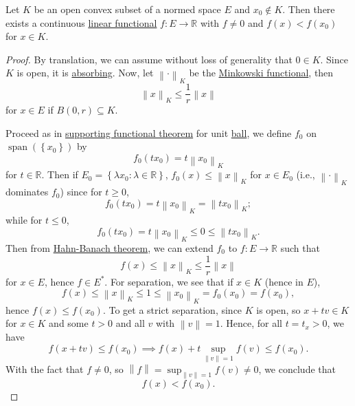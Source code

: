 \begin{theorem}\label{thm:separation-of-a-point-from-a-convex-set}
	Let \(K\) be an open convex subset of a normed space \(E\) and \(x_0 \notin K\). Then there exists a continuous \hyperref[def:linear-functional]{linear functional} \(f\colon E\to \mathbb{R} \) with \(f\neq 0\) and \(f(x) < f(x_0)\) for \(x\in K\).
\end{theorem}
\begin{proof}
	By translation, we can assume without loss of generality that \(0\in K\). Since \(K\) is open, it is \hyperref[def:absorbing]{absorbing}. Now, let \(\left\lVert \cdot\right\rVert _K\) be the \hyperref[def:Minkowski-functional]{Minkowski functional}, then
	\[
		\left\lVert x\right\rVert _K \leq \frac{1}{r}\left\lVert x\right\rVert
	\]
	for \(x\in E\) if \(B(0, r)\subseteq K\).
	\begin{center}
	\end{center}
	Proceed as in \hyperref[thm:supporting-functional]{supporting functional theorem} for unit \hyperref[def:ball]{ball}, we define \(f_0\) on \(\mathop{\mathrm{span}}(\left\{ x_0 \right\} )\) by
	\[
		f_0(tx_0) = t\left\lVert x_0\right\rVert_K
	\]
	for \(t\in \mathbb{R} \). Then if \(E_0 = \left\{ \lambda x_0 \colon \lambda \in \mathbb{R}  \right\} \), \(f_0 (x) \leq \left\lVert x\right\rVert _K\) for \(x\in E_0\) (i.e., \(\left\lVert \cdot\right\rVert _K\) dominates \(f_0\)) since for \(t \geq 0\),
	\[
		f_0 (tx_0) = t \left\lVert x_0\right\rVert _K= \left\lVert t x_0\right\rVert_K;
	\]
	while for \(t \leq 0\),
	\[
		f_0 ( tx_0) = t\left\lVert x_0\right\rVert_K \leq 0\leq \left\lVert t x_0\right\rVert _K.
	\]
	Then from \hyperref[thm:Hahn-Banach]{Hahn-Banach theorem}, we can extend \(f_0\) to \(f\colon E\to \mathbb{R} \) such that
	\[
		f(x) \leq \left\lVert x\right\rVert _K \leq \frac{1}{r} \left\lVert x\right\rVert
	\]
	for \(x\in E\), hence \(f\in E^{\ast} \). For separation, we see that if \(x\in K\) (hence in \(E\)),
	\[
		f(x) \leq \left\lVert x\right\rVert _K \leq 1 \leq \left\lVert x_0\right\rVert _K = f_0 (x_0) = f(x_0),
	\]
	hence \(f(x) \leq f(x_0)\). To get a strict separation, since \(K\) is open, so \(x + tv\in K\) for \(x\in K\) and some \(t > 0\) and all \(v\) with \(\left\lVert v\right\rVert = 1\). Hence, for all \(t = t_x > 0\), we have
	\[
		f(x + tv) \leq f(x_0) \implies f(x) + t \sup _{\left\lVert v\right\rVert = 1}f(v) \leq f(x_0).
	\]
	With the fact that \(f\neq 0\), so \(\left\lVert f\right\rVert = \sup _{\left\lVert v\right\rVert = 1}f(v) \neq 0\), we conclude that
	\[
		f(x) < f(x_0).
	\]
\end{proof}

